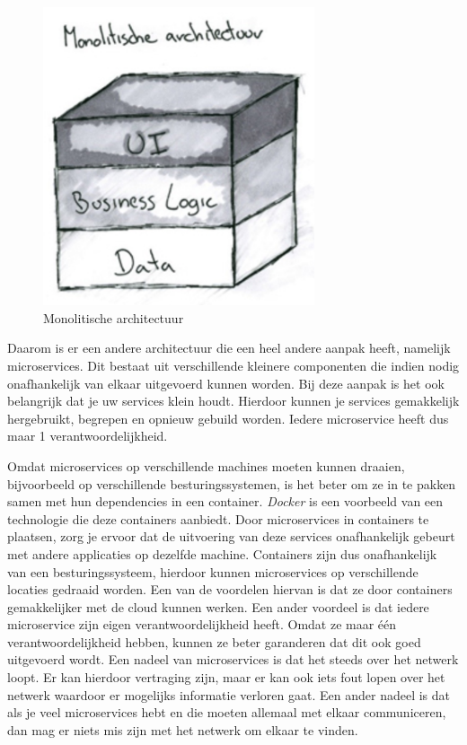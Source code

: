 \begin{figure}[h!]
    \centering
    \includegraphics[width=80mm]{../monolith.png}
    \caption{Monolitische architectuur}
        
\end{figure}

Daarom is er een andere architectuur die een heel andere aanpak heeft, namelijk microservices. Dit bestaat uit verschillende kleinere componenten die indien nodig onafhankelijk van elkaar uitgevoerd kunnen worden. Bij deze aanpak is het ook belangrijk dat je uw services klein houdt. Hierdoor kunnen je services gemakkelijk hergebruikt, begrepen en opnieuw gebuild worden. Iedere microservice heeft dus maar 1 verantwoordelijkheid.

Omdat microservices op verschillende machines moeten kunnen draaien, bijvoorbeeld op verschillende besturingssystemen, is het beter om ze in te pakken samen met hun dependencies in een container. \emph{Docker} is een voorbeeld van een technologie die deze containers aanbiedt. Door microservices in containers te plaatsen, zorg je ervoor dat de uitvoering van deze services onafhankelijk gebeurt met andere applicaties op dezelfde machine. Containers zijn dus onafhankelijk van een besturingssysteem, hierdoor kunnen microservices op verschillende locaties gedraaid worden. Een van de voordelen hiervan is dat ze door containers gemakkelijker met de cloud kunnen werken. Een ander voordeel is dat iedere microservice zijn eigen verantwoordelijkheid heeft. Omdat ze maar één verantwoordelijkheid hebben, kunnen ze beter garanderen dat dit ook goed uitgevoerd wordt. Een nadeel van microservices is dat het steeds over het netwerk loopt. Er kan hierdoor vertraging zijn, maar er kan ook iets fout lopen over het netwerk waardoor er mogelijks informatie verloren gaat. Een ander nadeel is dat als je veel microservices hebt en die moeten allemaal met elkaar communiceren, dan mag er niets mis zijn met het netwerk om elkaar te vinden.

